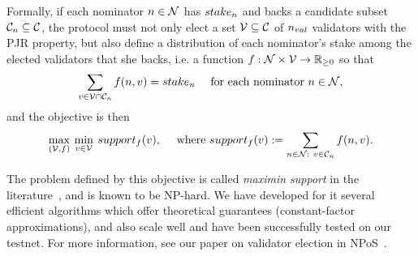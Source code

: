 Formally, if each nominator $n \in \mathcal{N}$ has $stake_{n}$ and backs a candidate subset $\mathcal{C}_{n}\subseteq \mathcal{C}$,
the protocol must not only elect a set $\mathcal{V}\subseteq \mathcal{C}$ of $n_{val}$ validators
with the PJR property, but also define a distribution of each nominator's stake among the elected validators that she backs,
i.e. a function $f:\mathcal{N}\times\mathcal{V} \rightarrow \mathbb{R}_{\geq 0}$ so that
$$\sum_{v\in \mathcal{V}\cap \mathcal{C}_{n}} f(n, v) = stake_{n} \quad \text{ for each nominator } n\in\mathcal{N},$$
and the objective is then
$$\max_{(\mathcal{V}, f)} \: \min_{v\in \mathcal{V}} \: support_f(v),
\quad \text{ where } support_f(v) := \sum_{n\in \mathcal{N}: \ v\in \mathcal{C}_{n}} f(n, v). $$

The problem defined by this objective is called \emph{maximin support} in the literature~\cite{sanchez2016maximin}, and is known to be NP-hard.
We have developed for it several efficient algorithms which offer theoretical guarantees 
(constant-factor approximations), and also scale well and have been successfully tested on our testnet. 
For more information, see our paper on validator election in NPoS~\cite{NPoSpaper}.

